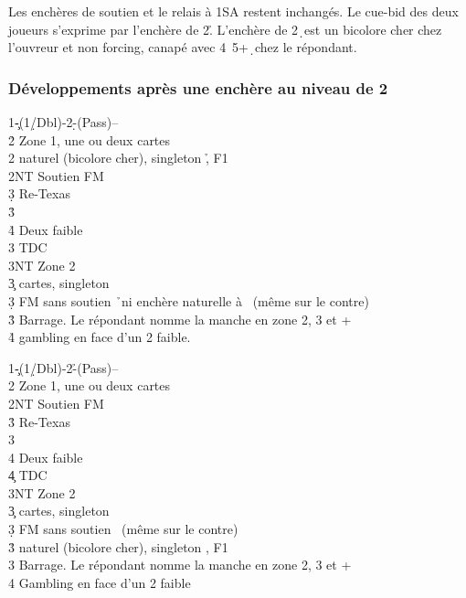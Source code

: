 \documentclass[a4paper]{article}
\begin{document}
Les enchères de soutien et le relais à 1SA restent inchangés.
Le cue-bid des deux joueurs s’exprime par l’enchère de 2\h .
L’enchère de 2\d\ est un bicolore cher chez l’ouvreur et non forcing, canapé avec 4\s\ 5+\d\ chez le 
répondant.

\subsubsection{Développements après une enchère au niveau de 2}

\begin{bidtable}
1\c-(1\d/Dbl)-2\d-(Pass)--\\
2\h \> Zone 1, une ou deux cartes\\
2\s \> naturel (bicolore cher), singleton \h , F1\\
2NT \> Soutien FM\+\\
3\d \> Re-Texas\+\\
3\h\+\\
4\h \> Deux faible\\
3\s \> TDC\\
3NT \> Zone 2\-\-\-\\
3\c {} cartes, singleton \h \\
3\d \> FM sans soutien \h\ ni enchère naturelle à \s\ (même sur le contre)\\
3\h \> Barrage. Le répondant nomme la manche en zone 2, 3 et +\\
4\h \> gambling en face d'un 2 faible.
\end{bidtable}

\begin{bidtable}
1\c-(1\d/Dbl)-2\h-(Pass)--\\
2\s \> Zone 1, une ou deux cartes\\
2NT \> Soutien FM\+\\
3\h \> Re-Texas\+\\
3\s\+\\
4\s \> Deux faible\\
4\c \> TDC\\
3NT \> Zone 2\-\-\-\\
3\c {} cartes, singleton \s \\
3\d \> FM sans soutien \s\ (même sur le contre)\\
3\h \> naturel (bicolore cher), singleton \s , F1\\
3\s \> Barrage. Le répondant nomme la manche en zone 2, 3 et +\\
4\s \> Gambling en face d'un 2 faible
\end{bidtable}
\end{document}
